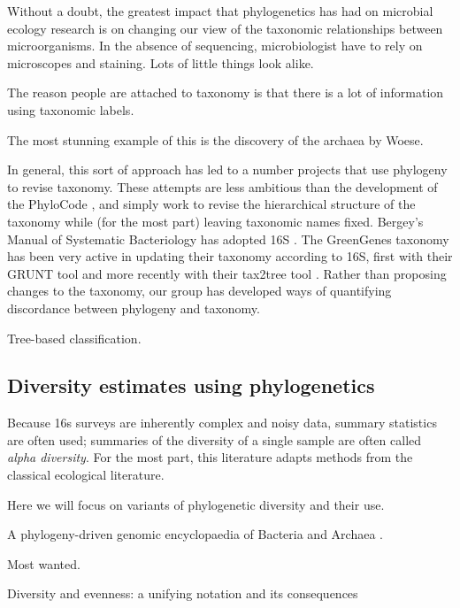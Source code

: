 \documentclass{amsart}
\begin{document}
Without a doubt, the greatest impact that phylogenetics has had on microbial ecology research is on changing our view of the taxonomic relationships between microorganisms.
In the absence of sequencing, microbiologist have to rely on microscopes and staining.
Lots of little things look alike.

The reason people are attached to taxonomy is that there is a lot of information using taxonomic labels.

The most stunning example of this is the discovery of the archaea by Woese.

In general, this sort of approach has led to a number projects that use phylogeny to revise taxonomy.
These attempts are less ambitious than the development of the PhyloCode \cite{forey2001phylocode}, and simply work to revise the hierarchical structure of the taxonomy while (for the most part) leaving taxonomic names fixed.
Bergey's Manual of Systematic Bacteriology has adopted 16S \cite{kreig1984bergey}.
The GreenGenes taxonomy \cite{desantis2006greengenes} has been very active in updating their taxonomy according to 16S, first with their GRUNT tool \cite{dalevi2007automated} and more recently with their tax2tree tool \cite{mcdonald2011improved}.
Rather than proposing changes to the taxonomy, our group \cite{matsen2011reconciling} has developed ways of quantifying discordance between phylogeny and taxonomy.

Tree-based classification.
\cite{bazinet2012comparative}



\subsection{Diversity estimates using phylogenetics}

Because 16s surveys are inherently complex and noisy data, summary statistics are often used; summaries of the diversity of a single sample are often called \emph{alpha diversity}.
For the most part, this literature adapts methods from the classical ecological literature.

Here we will focus on variants of phylogenetic diversity and their use.



A phylogeny-driven genomic encyclopaedia of Bacteria and Archaea \cite{wu2009phylogeny}.

Most wanted.

\cite{hill1973diversity}
Diversity and evenness: a unifying notation and its consequences
\end{document}
